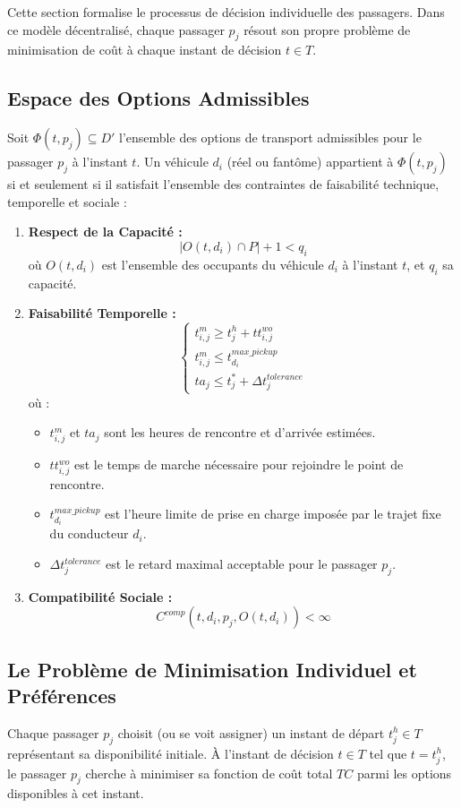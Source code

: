 \documentclass[12pt, a4paper]{article}
\begin{document}
Cette section formalise le processus de décision individuelle des passagers. Dans ce modèle décentralisé, chaque passager $p_j$ résout son propre problème de minimisation de coût à chaque instant de décision $t \in T$.

\subsection{Espace des Options Admissibles}
Soit $\Phi(t, p_j) \subseteq D'$ l'ensemble des options de transport admissibles pour le passager $p_j$ à l'instant $t$. Un véhicule $d_i$ (réel ou fantôme) appartient à $\Phi(t, p_j)$ si et seulement si il satisfait l'ensemble des contraintes de faisabilité technique, temporelle et sociale :

\begin{enumerate}
    \item \textbf{Respect de la Capacité :}
    $$ |O(t, d_i) \cap P| + 1 <  q_i $$
    où $O(t, d_i)$ est l'ensemble des occupants du véhicule $d_i$ à l'instant $t$, et $q_i$ sa capacité.

    \item \textbf{Faisabilité Temporelle :}
    $$ \begin{cases}
        t^m_{i,j} \geq t^h_j + tt^{wo}_{i,j} \\
        t^m_{i,j} \leq t^{max\_pickup}_{d_i} \\
        ta_j \leq t^*_j + \Delta t^{tolerance}_j
    \end{cases} $$
    où :
    \begin{itemize}
        \item $t^m_{i,j}$ et $ta_j$ sont les heures de rencontre et d'arrivée estimées.
        \item $tt^{wo}_{i,j}$ est le temps de marche nécessaire pour rejoindre le point de rencontre.
        \item $t^{max\_pickup}_{d_i}$ est l'heure limite de prise en charge imposée par le trajet fixe du conducteur $d_i$.
        \item $\Delta t^{tolerance}_j$ est le retard maximal acceptable pour le passager $p_j$.
    \end{itemize}

    \item \textbf{Compatibilité Sociale :}
    $$ C^{comp}(t, d_i, p_j, O(t, d_i)) < \infty $$
\end{enumerate}

\subsection{Le Problème de Minimisation Individuel et Préférences}
Chaque passager $p_j$ choisit (ou se voit assigner) un instant de départ $t^h_j \in T$ représentant sa disponibilité initiale. À l'instant de décision $t \in T$ tel que $t = t^h_j$, le passager $p_j$ cherche à minimiser sa fonction de coût total $TC$ parmi les options disponibles à cet instant.
\end{document}
